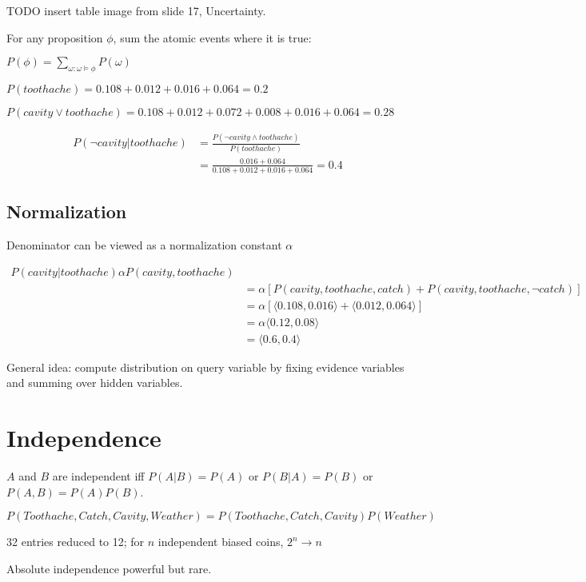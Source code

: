 TODO insert table image from slide 17, Uncertainty.

For any proposition $\phi$, sum the atomic events where it is true:

{\centering
    $P(\phi) = \sum_{\omega:\omega\models\phi} P(\omega)$

}

$P(toothache) = 0.108 + 0.012 + 0.016 + 0.064 = 0.2$

$P(cavity \lor toothache) = 0.108 + 0.012 + 0.072 + 0.008 + 0.016 + 0.064 =
0.28$

\begin{align*}
    P(\neg cavity | toothache) &= \frac{P(\neg cavity \land toothache)}{P(toothache)}\\
                               &= \frac{0.016 + 0.064}{0.108 + 0.012 + 0.016 + 0.064} = 0.4
\end{align*}

\subsection{Normalization}
Denominator can be viewed as a normalization constant $\alpha$

\begin{align*}
    P(cavity|toothache) \alpha P(cavity,toothache)\\
    &= \alpha[P(cavity,toothache,catch) + P(cavity,toothache,\neg catch)]\\
    &= \alpha[\langle 0.108, 0.016 \rangle + \langle 0.012, 0.064 \rangle]\\
    &= \alpha\langle 0.12, 0.08\rangle\\
    &= \langle 0.6, 0.4 \rangle
\end{align*}

General idea: compute distribution on query variable by fixing evidence
variables and summing over hidden variables.

\section{Independence}
$A$ and $B$ are independent iff $P(A|B) = P(A)$ or $P(B|A) = P(B)$ or $P(A,B) =
P(A)P(B)$.

$P(Toothache,Catch,Cavity,Weather) = P(Toothache,Catch,Cavity)P(Weather)$

32 entries reduced to 12; for $n$ independent biased coins, $2^n \rightarrow n$

Absolute independence powerful but rare.

